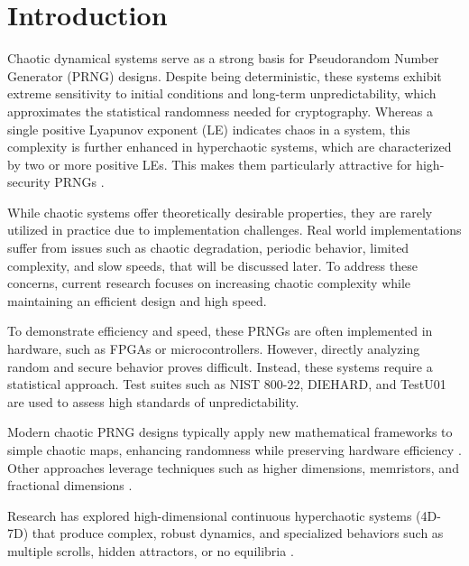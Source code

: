 \documentclass[preprint,12pt]{elsarticle}
\begin{document}


\section{Introduction}
\label{Sec_1}
Chaotic dynamical systems serve as a strong basis for Pseudorandom Number Generator (PRNG) designs. Despite being deterministic, these systems exhibit extreme sensitivity to initial conditions and long-term unpredictability, which approximates the statistical randomness needed for cryptography. Whereas a single positive Lyapunov exponent (LE) indicates chaos in a system, this complexity is further enhanced in hyperchaotic systems, which are characterized by two or more positive LEs. This makes them particularly attractive for high-security PRNGs \cite{li_high-performance_2024,nguyen_designing_2022,al-azzawi_new_2023}. 

While chaotic systems offer theoretically desirable properties, they are rarely utilized in practice due to implementation challenges. Real world implementations suffer from issues such as chaotic degradation, periodic behavior, limited complexity, and slow speeds, that will be discussed later. To address these concerns, current research focuses on increasing chaotic complexity while maintaining an efficient design and high speed.

To demonstrate efficiency and speed, these PRNGs are often implemented in hardware, such as FPGAs or microcontrollers. However, directly analyzing random and secure behavior proves difficult. Instead, these systems require a statistical approach. Test suites such as NIST 800-22, DIEHARD, and TestU01 are used to assess high standards of unpredictability.

Modern chaotic PRNG designs typically apply new mathematical frameworks to simple chaotic maps, enhancing randomness while preserving hardware efficiency \cite{luo_design_2024,sun_dynamic_2025}. Other approaches leverage techniques such as higher dimensions, memristors, and fractional dimensions \cite{moussa_ultra_2026,fraga_design_2025}.

Research has explored high-dimensional continuous hyperchaotic systems (4D-7D) that produce complex, robust dynamics, and specialized behaviors such as multiple scrolls, hidden attractors, or no equilibria \cite{vaidyanathan_new_2021, benkouider_novel_2024,yang_hidden_2019, dong_hidden_2022, al-talib_new_2023}. 
 
\end{document}

